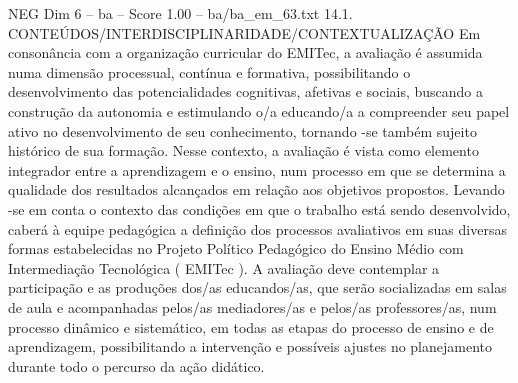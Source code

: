 \begin{textsample}{NEG Dim 6 – ba – Score 1.00 – ba/ba\_em\_63.txt}  \label{ex:f6_neg_220}
14.1.
CONTEÚDOS/INTERDISCIPLINARIDADE/CONTEXTUALIZAÇÃO Em consonância com a organização curricular do EMITec, a avaliação é assumida numa dimensão processual, contínua e formativa, possibilitando o desenvolvimento das potencialidades cognitivas, afetivas e sociais, buscando a construção da autonomia e estimulando o/a educando/a a compreender seu papel ativo no desenvolvimento de seu conhecimento, tornando -se também sujeito histórico de sua formação.
Nesse contexto, a avaliação é vista como elemento integrador entre a aprendizagem e o ensino, num processo em que se determina a qualidade dos resultados alcançados em relação aos objetivos propostos.
Levando -se em conta o contexto das condições em que o trabalho está sendo desenvolvido, caberá à equipe pedagógica a definição dos processos avaliativos em suas diversas formas estabelecidas no Projeto Político Pedagógico do Ensino Médio com Intermediação Tecnológica ( EMITec ).
A avaliação deve contemplar a participação e as produções dos/as educandos/as, que serão socializadas em salas de aula e acompanhadas pelos/as mediadores/as e pelos/as professores/as, num processo dinâmico e sistemático, em todas as etapas do processo de ensino e de aprendizagem, possibilitando a intervenção e possíveis ajustes no planejamento durante todo o percurso da ação didático.

\end{textsample}
